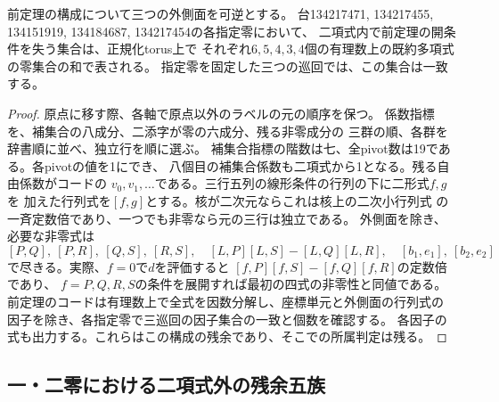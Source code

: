 \begin{corollary}[補集合二項式内の残余因子]
\label{cor:ou-complement-pencil-factors}
前定理の構成について三つの外側面を可逆とする。
台134217471, 134217455, 134151919, 134184687, 134217454の各指定零において、
二項式内で前定理の開条件を失う集合は、正規化torus上で
それぞれ$6,5,4,3,4$個の有理数上の既約多項式の零集合の和で表される。
指定零を固定した三つの巡回では、この集合は一致する。
\end{corollary}
\begin{proof}
原点に移す際、各軸で原点以外のラベルの元の順序を保つ。
係数指標を、補集合の八成分、二添字が零の六成分、残る非零成分の
三群の順、各群を辞書順に並べ、独立行を順に選ぶ。
補集合指標の階数は七、全pivot数は19である。各pivotの値を1にでき、
八個目の補集合係数も二項式から1となる。残る自由係数がコードの
$v_0,v_1,\ldots$である。三行五列の線形条件の行列の下に二形式$f,g$を
加えた行列式を$[f,g]$とする。核が二次元ならこれは核上の二次小行列式
の一斉定数倍であり、一つでも非零なら元の三行は独立である。
外側面を除き、必要な非零式は
\[
 [P,Q],\ [P,R],\ [Q,S],\ [R,S],\quad
 [L,P][L,S]-[L,Q][L,R],\quad [b_1,e_1],\ [b_2,e_2]
\]
で尽きる。実際、$f=0$で$d$を評価すると
$[f,P][f,S]-[f,Q][f,R]$の定数倍であり、
$f=P,Q,R,S$の条件を展開すれば最初の四式の非零性と同値である。
前定理のコードは有理数上で全式を因数分解し、座標単元と外側面の行列式の
因子を除き、各指定零で三巡回の因子集合の一致と個数を確認する。
各因子の式も出力する。これらはこの構成の残余であり、そこでの所属判定は残る。
\end{proof}

\subsection{一・二零における二項式外の残余五族}
\label{subsec:ou-one-two-zero-graphs}

